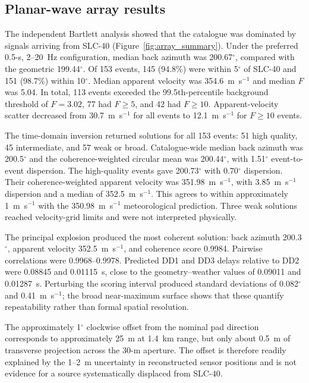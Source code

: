 \documentclass[]{seismica}
\begin{document}
\subsection{Planar-wave array results}
\label{sec:results_array}

The independent Bartlett analysis showed that the catalogue was dominated by
signals arriving from SLC-40 (Figure~\ref{fig:array_summary}). Under the
preferred 0.5-s, 2--20~Hz configuration, median back azimuth was
200.67$^\circ$, compared with the geometric 199.44$^\circ$. Of 153 events,
145 (94.8\%) were within 5$^\circ$ of SLC-40 and 151 (98.7\%) within
10$^\circ$. Median apparent velocity was 354.6~m~s$^{-1}$ and median $F$ was
5.04. In total, 113 events exceeded the 99.5th-percentile background threshold
of $F=3.02$, 77 had $F\geq5$, and 42 had $F\geq10$. Apparent-velocity scatter
decreased from 30.7~m~s$^{-1}$ for all events to 12.1~m~s$^{-1}$ for
$F\geq10$ events.

The time-domain inversion returned solutions for all 153 events: 51 high
quality, 45 intermediate, and 57 weak or broad. Catalogue-wide median back
azimuth was 200.5$^\circ$ and the coherence-weighted circular mean was
200.44$^\circ$, with 1.51$^\circ$ event-to-event dispersion. The high-quality
events gave 200.73$^\circ$ with 0.70$^\circ$ dispersion. Their
coherence-weighted apparent velocity was 351.98~m~s$^{-1}$, with
3.85~m~s$^{-1}$ dispersion and a median of 352.5~m~s$^{-1}$. This agrees to
within approximately 1~m~s$^{-1}$ with the 350.98~m~s$^{-1}$ meteorological
prediction. Three weak solutions reached velocity-grid limits and were not
interpreted physically.

The principal explosion produced the most coherent solution: back azimuth
200.3$^\circ$, apparent velocity 352.5~m~s$^{-1}$, and coherence score 0.9984.
Pairwise correlations were 0.9968--0.9978. Predicted DD1 and DD3 delays relative
to DD2 were 0.08845 and 0.01115~s, close to the geometry--weather values of
0.09011 and 0.01287~s. Perturbing the scoring interval produced standard
deviations of 0.082$^\circ$ and 0.41~m~s$^{-1}$; the broad near-maximum surface
shows that these quantify repeatability rather than formal spatial resolution.

The approximately 1$^\circ$ clockwise offset from the nominal pad direction
corresponds to approximately 25~m at 1.4~km range, but only about 0.5~m of
transverse projection across the 30-m aperture. The offset is therefore readily
explained by the 1--2~m uncertainty in reconstructed sensor positions and is not
evidence for a source systematically displaced from SLC-40.
\end{document}
